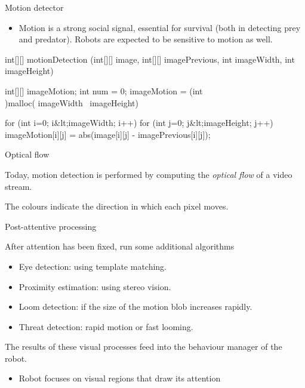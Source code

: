 \documentclass[compress]{beamer}
\begin{document}
\begin{frame}[fragile]{Motion detector}

\begin{itemize}

\item Motion is a strong social signal, essential for survival (both in
  detecting prey and predator). Robots are expected to be sensitive to
  motion as well.
\end{itemize}

\begin{matlabcode}
int[][] motionDetection (int[][] image,
        int[][] imagePrevious, int imageWidth, int
        imageHeight)

{
    int[][] imageMotion;
    int num = 0;
    imageMotion = (int\\)malloc( imageWidth \ imageHeight)

    for (int i=0; i&lt;imageWidth; i++)
    {
        for (int j=0; j&lt;imageHeight; j++)
        {
            imageMotion[i][j] = abs(image[i][j] - imagePrevious[i][j]);
        }
    }
}
\end{matlabcode}

\end{frame}

\begin{frame}{Optical flow}

    Today, motion detection is performed by computing the \emph{optical flow}
    of a video stream.


    The colours indicate the direction in which each pixel moves.


\end{frame}


\begin{frame}{Post-attentive processing}

After attention has been fixed, run some additional algorithms

\begin{itemize}

\item Eye detection: using template matching.
\item Proximity estimation: using stereo vision.
\item Loom detection: if the size of the motion blob increases rapidly.
\item Threat detection: rapid motion or fast looming.
\end{itemize}

The results of these visual processes feed into the behaviour manager of
the robot.

\begin{itemize}

\item Robot focuses on visual regions that draw its attention
\end{itemize}

\end{frame}
\end{document}
